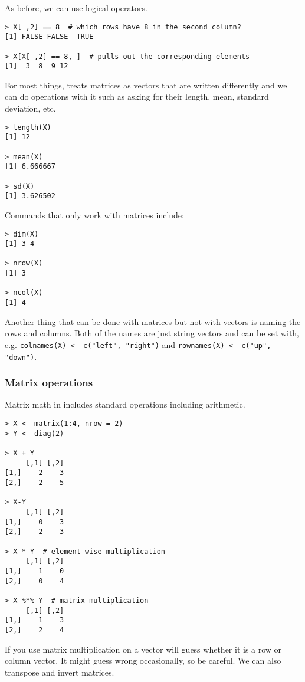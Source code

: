 As before, we can use logical operators.

\begin{lstlisting}
> X[ ,2] == 8  # which rows have 8 in the second column?
[1] FALSE FALSE  TRUE

> X[X[ ,2] == 8, ]  # pulls out the corresponding elements
[1]  3  8  9 12
\end{lstlisting}

For most things, \R treats matrices as vectors that are written differently and we can do operations with it such as asking for their length, mean, standard deviation, etc.

\begin{lstlisting}
> length(X)
[1] 12

> mean(X)
[1] 6.666667

> sd(X)
[1] 3.626502
\end{lstlisting}

Commands that only work with matrices include:

\begin{lstlisting}
> dim(X)
[1] 3 4

> nrow(X)
[1] 3

> ncol(X)
[1] 4
\end{lstlisting}

Another thing that can be done with matrices but not with vectors is naming the rows and columns. Both of the names are just string vectors and can be set with, e.g. \verb|colnames(X) <- c("left", "right")| and \verb|rownames(X) <- c("up", "down")|.

\subsubsection*{Matrix operations}

Matrix math in \R includes standard operations including arithmetic.

\begin{lstlisting}
> X <- matrix(1:4, nrow = 2)
> Y <- diag(2)

> X + Y
     [,1] [,2]
[1,]    2    3
[2,]    2    5

> X-Y
     [,1] [,2]
[1,]    0    3
[2,]    2    3

> X * Y  # element-wise multiplication
     [,1] [,2]
[1,]    1    0
[2,]    0    4

> X %*% Y  # matrix multiplication
     [,1] [,2]
[1,]    1    3
[2,]    2    4
\end{lstlisting}

If you use matrix multiplication on a vector \R will guess whether it is a row or column vector. It might guess wrong occasionally, so be careful. We can also transpose and invert matrices.

